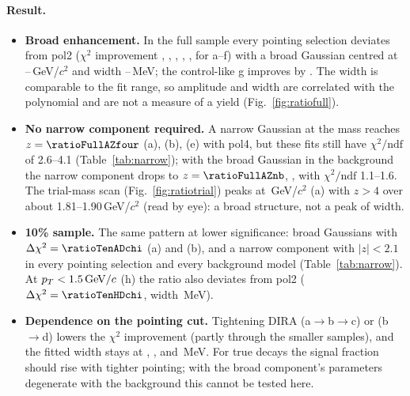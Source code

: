 \paragraph{Result.}
\begin{itemize}
\item \textbf{Broad enhancement.} In the full sample every pointing selection deviates from pol2 ($\chi^2$ improvement
  \ratioFullADchi, \ratioFullBDchi, \ratioFullCDchi, \ratioFullDDchi, \ratioFullEDchi, \ratioFullFDchi{} for a--f) with a
  broad Gaussian centred at \ratioFullEMean--\ratioFullFMean\,GeV/$c^2$ and width
  \ratioFullFSig--\ratioFullCSig\,MeV; the control-like g improves by \ratioFullGDchi. The width is comparable to the fit
  range, so amplitude and width are correlated with the polynomial and are not a measure of a yield
  (Fig.~\ref{fig:ratiofull}).
\item \textbf{No narrow component required.} A narrow Gaussian at the \Dzero{} mass reaches $z=\ratioFullAZfour$
  (a), \ratioFullBZfour{} (b), \ratioFullEZfour{} (e) with pol4, but these fits still have $\chi^2/\mathrm{ndf}$ of 2.6--4.1
  (Table~\ref{tab:narrow}); with the broad Gaussian in the background the narrow component drops to $z=\ratioFullAZnb$,
  \ratioFullBZnb, \ratioFullEZnb{} with $\chi^2/\mathrm{ndf}$ 1.1--1.6. The trial-mass scan (Fig.~\ref{fig:ratiotrial})
  peaks at \ratioFullATrialMmax\,GeV/$c^2$ (a) with $z>4$ over about 1.81--1.90\,GeV/$c^2$ (read by eye): a broad
  structure, not a peak of \Dzero{} width.
\item \textbf{10\% sample.} The same pattern at lower significance: broad Gaussians with $\Delta\chi^2=\ratioTenADchi$ (a) and \ratioTenBDchi{} (b), and a narrow component with $|z|<2.1$ in every pointing selection and every
  background model (Table~\ref{tab:narrow}). At $p_T<1.5\,\mathrm{GeV}/c$ (h) the ratio also deviates from pol2 ($\Delta\chi^2=
  \ratioTenHDchi$, width \ratioTenHSig\,MeV).
\item \textbf{Dependence on the pointing cut.} Tightening DIRA (a$\to$b$\to$c) or \Ls{} (b$\to$d) lowers the $\chi^2$
  improvement (partly through the smaller samples), and the fitted width stays at \ratioFullASig, \ratioFullBSig,
  \ratioFullCSig{} and \ratioFullDSig\,MeV. For true \Dzero{} decays the signal fraction should rise with tighter pointing; with the broad
  component's parameters degenerate with the background this cannot be tested here.
\end{itemize}


